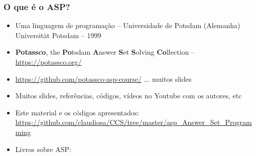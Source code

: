 \documentclass{beamer}
\begin{document}
\begin{frame}%

\frametitle{O que é o ASP?}


\begin{block}{}
  \begin{itemize}
   \item Uma linguagem de programação -- Universidade de Potsdam (Alemanha)\\ Universität Potsdam -- 1999
   
   \item  \textbf{Potassco}, the \textbf{Po}tsdam \textbf{A}nswer \textbf{S}et \textbf{S}olving \textbf{Co}llection -- \url{https://potassco.org/}
   
   \item \url{https://github.com/potassco-asp-course/} ... muitos slides

  \item  Muitos slides, referências, códigos, vídeos no Youtube com os autores, etc
  
  \item Este material e os códigos apresentados:\\
  \url{https://github.com/claudiosa/CCS/tree/master/asp_Answer_Set_Programming}
  
  \item Livros sobre ASP: 

 \end{itemize}
  
\end{block}

\end{frame}


\end{document}
